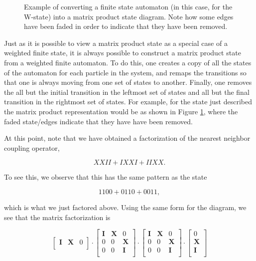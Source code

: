 \documentclass[12pt]{amsbook}
\theoremstyle{plain}
\theoremstyle{definition}
\theoremstyle{remark}
\begin{document}
\begin{figure}
\caption{Example of converting a finite state automaton (in this case, for the W-state) into a matrix product state diagram.  Note how some edges have been faded in order to indicate that they have been removed.}
\label{fig:automaton2mps}
\end{figure}

Just as it is possible to view a matrix product state as a special case of a weighted finite state, it is always possible to construct a matrix product state from a weighted finite automaton.  To do this, one creates a copy of all the states of the automaton for each particle in the system, and remaps the transitions so that one is always moving from one set of states to another.  Finally, one removes the all but the initial transition in the leftmost set of states and all but the final transition in the rightmost set of states.  For example, for the state just described the matrix product representation would be as shown in Figure \ref{fig:automaton2mps}, where the faded state/edges indicate that they have have been removed.

At this point, note that we have obtained a factorization of the nearest neighbor coupling operator,

$$XXII + IXXI + IIXX.$$

To see this, we observe that this has the same pattern as the state

$$1100 + 0110 + 0011,$$

\noindent which is what we just factored above.  Using the same form for the diagram, we see that the matrix factorization is 

$$
\begin{bmatrix}
\textbf{I} & \textbf{X} & 0 \\
\end{bmatrix}
\cdot
\begin{bmatrix}
\textbf{I} & \textbf{X} & 0 \\
0 & 0 & \textbf{X} \\
0 & 0 & \textbf{I} \\
\end{bmatrix}
\cdot
\begin{bmatrix}
\textbf{I} & \textbf{X} & 0 \\
0 & 0 & \textbf{X} \\
0 & 0 & \textbf{I} \\
\end{bmatrix}
\cdot
\begin{bmatrix}
0 \\
\textbf{X} \\
\textbf{I} \\
\end{bmatrix}
$$
\end{document}
